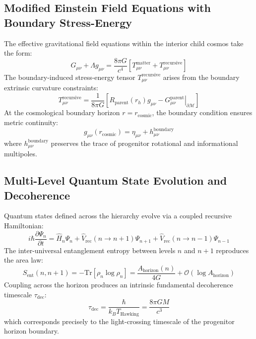 \documentclass[11pt,a4paper]{article}
\begin{document}
\subsection{Modified Einstein Field Equations with Boundary Stress-Energy}
The effective gravitational field equations within the interior child cosmos take the form:
\begin{equation}
G_{\mu\nu} + \Lambda g_{\mu\nu} = \frac{8\pi G}{c^4} \left[ T_{\mu\nu}^{\text{matter}} + T_{\mu\nu}^{\text{recursive}} \right]
\end{equation}
The boundary-induced stress-energy tensor $T_{\mu\nu}^{\text{recursive}}$ arises from the boundary extrinsic curvature constraints:
\begin{equation}
T_{\mu\nu}^{\text{recursive}} = \frac{1}{8\pi G} \left[ R_{\text{parent}}(r_h) g_{\mu\nu} - \left.G_{\mu\nu}^{\text{parent}}\right|_{\partial\mathcal{M}} \right]
\end{equation}
At the cosmological boundary horizon $r = r_{\text{cosmic}}$, the boundary condition ensures metric continuity:
\begin{equation}
g_{\mu\nu}(r_{\text{cosmic}}) = \eta_{\mu\nu} + h_{\mu\nu}^{\text{boundary}}
\end{equation}
where $h_{\mu\nu}^{\text{boundary}}$ preserves the trace of progenitor rotational and informational multipoles.

\subsection{Multi-Level Quantum State Evolution and Decoherence}
Quantum states defined across the hierarchy evolve via a coupled recursive Hamiltonian:
\begin{equation}
i\hbar \frac{\partial \Psi_n}{\partial t} = \hat{H}_n \Psi_n + \hat{V}_{\text{rec}}(n \to n+1)\Psi_{n+1} + \hat{V}_{\text{rec}}(n \to n-1)\Psi_{n-1}
\end{equation}
The inter-universal entanglement entropy between levels $n$ and $n+1$ reproduces the area law:
\begin{equation}
S_{\text{ent}}(n, n+1) = -\text{Tr}[\rho_n \log \rho_n] = \frac{A_{\text{horizon}}(n)}{4G} + \mathcal{O}(\log A_{\text{horizon}})
\end{equation}
Coupling across the horizon produces an intrinsic fundamental decoherence timescale $\tau_{\text{dec}}$:
\begin{equation}
\tau_{\text{dec}} = \frac{\hbar}{k_B T_{\text{Hawking}}} = \frac{8\pi G M}{c^3}
\end{equation}
which corresponds precisely to the light-crossing timescale of the progenitor horizon boundary.
\end{document}
